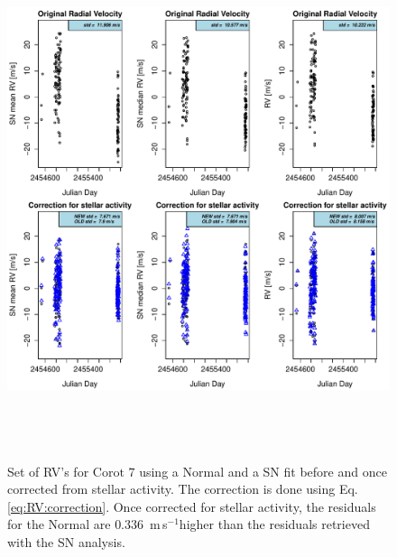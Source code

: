 \documentclass{aa}
\def\ms{\hbox{\,m\,s$^{-1}$}}         %
\begin{document}
\begin{figure} 
   \centering
\includegraphics[height = 6in]{NEW_CORRECTIONLRa01_E_[3]CorrectionActivity_RadialVelocity_vs_time.pdf} 
   \caption{Set of RV's for  $\text{Corot }7$ using a Normal and a SN fit before and once corrected from stellar activity. The correction is done using Eq. \ref{eq:RV:correction}. Once corrected for stellar activity, the residuals for the Normal are $0.336$ \ms higher than the residuals retrieved with the SN analysis.}
   \label{fig:Corot-7:correctionRV}
\end{figure}
\end{document}
